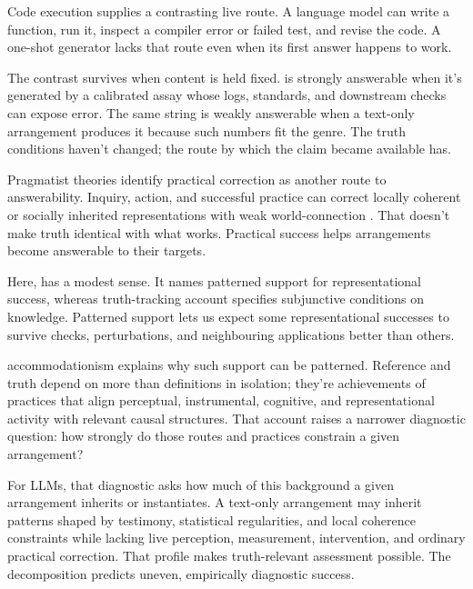 \documentclass[12pt]{article}
\begin{document}
Code execution supplies a contrasting live route. A language model can write a function, run it,
inspect a compiler error or failed test, and revise the code. A one-shot generator lacks
that route even when its first answer happens to work.

The contrast survives when content is held fixed.  is strongly answerable when it's generated by a calibrated assay whose logs,
standards, and downstream checks can expose error. The same string is weakly answerable
when a text-only arrangement produces it because such numbers fit the genre. The truth conditions
haven't changed; the route by which the claim became available has.

Pragmatist theories identify practical correction as another route to answerability.
Inquiry, action, and successful practice can correct locally coherent or socially inherited
representations with weak world-connection
\citep{james_1907_pragmatism,dewey_1941_propositions_warranted_assertibility_truth}. That
doesn't make truth identical with what works. Practical success helps arrangements become
answerable to their targets.

Here,  has a modest sense. It names patterned support
for representational success, whereas
 truth-tracking account specifies
subjunctive conditions on knowledge. Patterned support lets us expect some representational
successes to survive checks, perturbations, and neighbouring applications better than
others.

 accommodationism explains
why such support can be patterned. Reference and truth depend on more than definitions in
isolation; they're achievements of practices that align perceptual, instrumental,
cognitive, and representational activity with relevant causal structures. That account
raises a narrower diagnostic question: how strongly do those routes and practices
constrain a given arrangement?

For LLMs, that diagnostic asks how much of this background a given arrangement inherits or
instantiates. A text-only arrangement may inherit patterns shaped by testimony, statistical
regularities, and local coherence constraints while lacking live perception, measurement,
intervention, and ordinary practical correction. That profile makes
truth-relevant assessment possible. The decomposition predicts uneven, empirically
diagnostic success.
\end{document}
